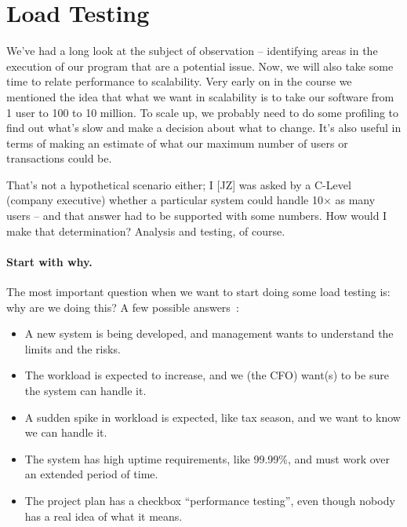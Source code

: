 




\section*{Load Testing}

We've had a long look at the subject of observation -- identifying areas in the execution of our program that are a potential issue. Now, we will also take some time to relate performance to scalability. Very early on in the course we mentioned the idea that what we want in scalability is to take our software from 1 user to 100 to 10 million. To scale up, we probably need to do some profiling to find out what's slow and make a decision about what to change. It's also useful in terms of making an estimate of what our maximum number of users or transactions could be. 

That's not a hypothetical scenario either; I [JZ] was asked by a C-Level (company executive) whether a particular system could handle 10$\times$ as many users -- and that answer had to be supported with some numbers. How would I make that determination? Analysis and testing, of course.

\paragraph{Start with why.} The most important question when we want to start doing some load testing is: why are we doing this? A few possible answers~\cite{hitchhiking}:
\begin{itemize}[noitemsep]
	\item A new system is being developed, and management wants to understand the limits and the risks.
	\item The workload is expected to increase, and we (the CFO) want(s) to be sure the system can handle it.
	\item A sudden spike in workload is expected, like tax season, and we want to know we can handle it.
	\item The system has high uptime requirements, like 99.99\%, and must work over an extended period of time. 
	\item The project plan has a checkbox ``performance testing'', even though nobody has a real idea of what it means.
\end{itemize}

